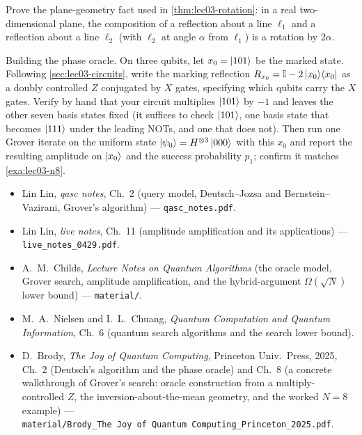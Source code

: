 \begin{exercise}\label{ex:lec03-7}
Prove the plane-geometry fact used in \cref{thm:lec03-rotation}: in a real
two-dimensional plane, the composition of a reflection about a line $\ell_1$ and a
reflection about a line $\ell_2$ (with $\ell_2$ at angle $\alpha$ from $\ell_1$) is
a rotation by $2\alpha$.
\end{exercise}

\begin{exercise}\label{ex:lec03-8}
Building the phase oracle. On three qubits, let $x_0=\ket{101}$ be the marked
state. Following \cref{sec:lec03-circuits}, write the marking reflection
$R_{x_0}=\mathbb{I}-2\ket{x_0}\!\bra{x_0}$ as a doubly controlled $Z$ conjugated by $X$
gates, specifying which qubits carry the $X$ gates. Verify by hand that your
circuit multiplies $\ket{101}$ by $-1$ and leaves the other seven basis states
fixed (it suffices to check $\ket{101}$, one basis state that becomes $\ket{111}$
under the leading NOTs, and one that does not). Then run one Grover iterate on the
uniform state $\ket{\psi_0}=H^{\otimes3}\ket{000}$ with this $x_0$ and report the
resulting amplitude on $\ket{x_0}$ and the success probability $p_1$; confirm it
matches \cref{exa:lec03-n8}.
\end{exercise}

\readingsection
\begin{itemize}[leftmargin=1.4em]
  \item Lin Lin, \emph{qasc notes}, Ch.~2 (query model, Deutsch--Jozsa and
        Bernstein--Vazirani, Grover's algorithm) --- \texttt{qasc\_notes.pdf}.
  \item Lin Lin, \emph{live notes}, Ch.~11 (amplitude amplification and its
        applications) --- \texttt{live\_notes\_0429.pdf}.
  \item A.~M.~Childs, \emph{Lecture Notes on Quantum Algorithms} (the oracle
        model, Grover search, amplitude amplification, and the hybrid-argument
        $\Omega(\sqrt N)$ lower bound) --- \texttt{material/}.
  \item M.~A.~Nielsen and I.~L.~Chuang, \emph{Quantum Computation and Quantum
        Information}, Ch.~6 (quantum search algorithms and the search lower bound).
  \item D.~Brody, \emph{The Joy of Quantum Computing}, Princeton Univ.\ Press,
        2025, Ch.~2 (Deutsch's algorithm and the phase oracle) and Ch.~8
        (a concrete walkthrough of Grover's search: oracle construction from a
        multiply-controlled $Z$, the inversion-about-the-mean geometry, and
        the worked $N=8$ example) ---
        \texttt{material/Brody\_The\ Joy\ of\ Quantum\ Computing\_Princeton\_2025.pdf}.
\end{itemize}
